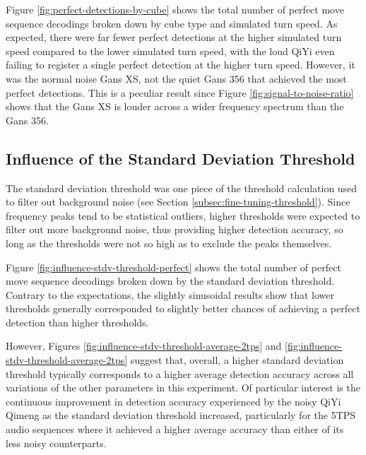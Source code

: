 Figure \ref{fig:perfect-detections-by-cube} shows the total number of
perfect move sequence decodings broken down by cube type and simulated
turn speed. As expected, there were far fewer perfect detections at the
higher simulated turn speed compared to the lower simulated turn speed,
with the loud QiYi even failing to register a single perfect detection
at the higher turn speed. However, it was the normal noise Gans XS, not
the quiet Gans 356 that achieved the most perfect detections. This is a
peculiar result since Figure \ref{fig:signal-to-noise-ratio} shows that
the Gans XS is louder across a wider frequency spectrum than the Gans
356.

\subsection{Influence of the Standard Deviation Threshold}
\label{subsec:influence-stdv-threshold}

The standard deviation threshold was one piece of the threshold
calculation used to filter out background noise (see Section
\ref{subsec:fine-tuning-threshold}). Since frequency peaks tend to be
statistical outliers, higher thresholds were expected to filter out
more background noise, thus providing higher detection accuracy, so
long as the thresholds were not so high as to exclude the peaks
themselves.

Figure \ref{fig:influence-stdv-threshold-perfect} shows the total number of
perfect move sequence decodings broken down by the standard deviation
threshold. Contrary to the expectations, the slightly sinusoidal results show that lower thresholds generally corresponded to slightly better chances of achieving a perfect detection than higher thresholds.

However, Figures \ref{fig:influence-stdv-threshold-average-2tps} and
\ref{fig:influence-stdv-threshold-average-2tps} suggest that, overall,
a higher standard deviation threshold typically corresponds to a higher
average detection accuracy across all variations of the other parameters in
this experiment. Of particular interest is the continuous improvement
in detection accuracy experienced by the noisy QiYi Qimeng as the
standard deviation threshold increased, particularly for the 5TPS audio
sequences where it achieved a higher average accuracy than either of
its less noisy counterparts.

